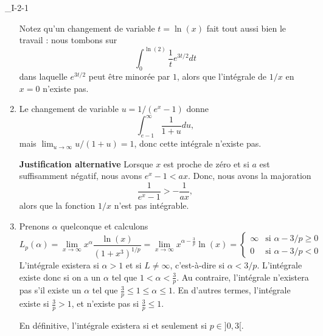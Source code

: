 \begin{corrige}{_I-2-1}
\begin{enumerate}
Notez qu'un changement de variable $t=\ln(x)$ fait tout aussi bien le travail : nous tombons sur
\begin{equation}
	\int_{0}^{\ln(2)}\frac{1}{ t } e^{3t/2}dt
\end{equation}
dans laquelle $ e^{3t/2}$ peut être minorée par $1$, alors que l'intégrale de $1/x$ en $x=0$ n'existe pas.

\item 

Le changement de variable $u=1/(e^x-1)$ donne
\begin{equation}
	\int_{e-1}^{\infty}\frac{1}{ 1+u }du,
\end{equation}
mais $\lim_{u\to\infty}u/(1+u)=1$, donc cette intégrale n'existe pas.

{\bf Justification alternative}
Lorsque $x$ est proche de zéro et si $a$ est suffisamment négatif, nous avons $ e^{x}-1<ax$. Donc, nous avons la majoration
\begin{equation}
	\frac{1}{  e^{x}-1 }>-\frac{1}{ ax },
\end{equation}
alors que la fonction $1/x$ n'est pas intégrable.

\item 

Prenons $\alpha$ quelconque et calculons
\begin{equation}
	L_p(\alpha)=\lim_{x\to\infty}x^{\alpha}\frac{ \ln(x) }{ (1+x^3)^{1/p} }=\lim_{x\to\infty}x^{\alpha-\frac{ 3 }{ p }}\ln(x)=\begin{cases}
	\infty	&	\text{si }\alpha-3/p\geq 0\\
	0	&	 \text{si }\alpha-3/p<0
\end{cases}
\end{equation}
L'intégrale existera si $\alpha>1$ et si $L\neq\infty$, c'est-à-dire si $\alpha<3/p$.  L'intégrale existe donc si on a un $\alpha$ tel que $1<\alpha<\frac{ 3 }{ p }$. Au contraire, l'intégrale n'existera pas s'il existe un $\alpha$ tel que $\frac{ 3 }{ p }\leq 1\leq\alpha\leq 1$. En d'autres termes, l'intégrale existe si $\frac{ 3 }{ p }>1$, et n'existe pas si $\frac{ 3 }{ p }\leq 1$.

En définitive, l'intégrale existera si et seulement si $p\in]0,3[$.


\end{enumerate}
\end{corrige}
